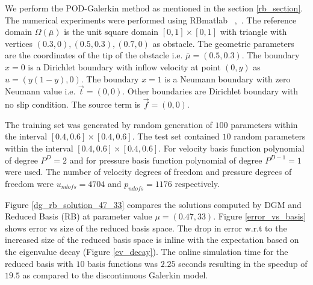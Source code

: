 \documentclass[graybox]{svmult}
\begin{document}
We perform the POD-Galerkin method as mentioned in the section \ref{rb_section}. The numerical experiments were performed using RBmatlab ~\cite{rbmatlab},~\cite{master_thesis}. The reference domain $\Omega({\bar{\mu}})$ is the unit square domain $[0,1] \times [0,1]$ with triangle with vertices $(0.3,0),(0.5,0.3),(0.7,0)$ as obstacle. The geometric parameters are the coordinates of the tip of the obstacle i.e. $\bar{\mu} = (0.5,0.3)$. The boundary ${x=0}$ is a Dirichlet boundary with inflow velocity at point $(0,y)$ as $u = (y(1-y), 0)$. The boundary ${x = 1}$ is a Neumann boundary with zero Neumann value i.e. $\overrightarrow{t} = (0, 0)$. Other boundaries are Dirichlet boundary with no slip condition. The source term is $\overrightarrow{f} = (0,0)$.

The training set was generated by random generation of $100$ parameters within the interval $[0.4,0.6] \times [0.4,0.6]$. The test set contained $10$ random parameters within the interval $[0.4,0.6] \times [0.4,0.6]$. For velocity basis function polynomial of degree $P^D = 2$ and for pressure basis function polynomial of degree $P^{D-1} = 1$ were used. The number of velocity degrees of freedom and pressure degrees of freedom were $u_{ndofs} = 4704$ and $p_{ndofs} = 1176$ respectively.

Figure \ref{dg_rb_solution_47_33} compares the solutions computed by DGM and Reduced Basis (RB) at parameter value $\mu = (0.47,33)$. Figure \ref{error_vs_basis} shows error vs size of the reduced basis space. The drop in error w.r.t to the increased size of the reduced basis space is inline with the expectation based on the eigenvalue decay (Figure \ref{ev_decay}). The online simulation time for the reduced basis with $10$ basis functions was $2.25$ seconds resulting in the speedup of $19.5$ as compared to the discontinuous Galerkin model.
\end{document}
